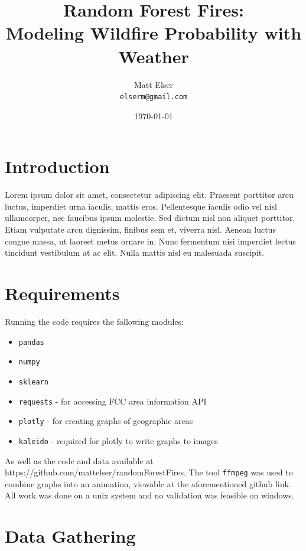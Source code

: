 \documentclass{article}
\title{Random Forest Fires:\\Modeling Wildfire Probability with Weather} %
\author{Matt Elser\\ \texttt{elserm@gmail.com}} %
\date{\today} %
\begin{document}
\maketitle %


\section*{Introduction} %

Lorem ipsum dolor sit amet, consectetur adipiscing elit. Praesent porttitor arcu luctus, imperdiet urna iaculis, mattis eros. Pellentesque iaculis odio vel nisl ullamcorper, nec faucibus ipsum molestie. Sed dictum nisl non aliquet porttitor. Etiam vulputate arcu dignissim, finibus sem et, viverra nisl. Aenean luctus congue massa, ut laoreet metus ornare in. Nunc fermentum nisi imperdiet lectus tincidunt vestibulum at ac elit. Nulla mattis nisl eu malesuada suscipit.

\section{Requirements} %

Running the code requires the following modules:
\begin{itemize}
	\item \lstinline|pandas|
	\item \lstinline|numpy|
	\item \lstinline|sklearn|
	\item \lstinline|requests| - for accessing FCC area information API
	\item \lstinline|plotly| - for creating graphs of geographic areas
	\item \lstinline|kaleido| - required for plotly to write graphs to images
\end{itemize}


As well as the code and data available at https://github.com/mattelser/randomForestFires. The tool \lstinline|ffmpeg| was used to combine graphs into an animation, viewable at the aforementioned github link. All work was done on a unix system and no validation was feasible on windows.  

\section{Data Gathering}
\end{document}
